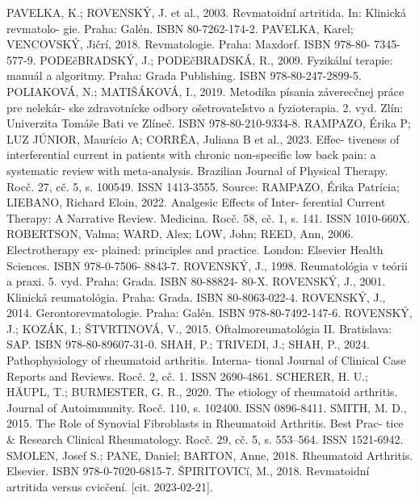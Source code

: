 PAVELKA, K.; ROVENSKÝ, J. et al., 2003. Revmatoidní artritida. In: Klinická revmatolo-
gie. Praha: Galén. ISBN 80-7262-174-2.
PAVELKA, Karel; VENCOVSKÝ, Jičrí, 2018. Revmatologie. Praha: Maxdorf. ISBN 978-80-
7345-577-9.
PODEčBRADSKÝ, J.; PODEčBRADSKÁ, R., 2009. Fyzikální terapie: manuál a algoritmy.
Praha: Grada Publishing. ISBN 978-80-247-2899-5.
POLIAKOVÁ, N.; MATIŠÁKOVÁ, I., 2019. Metodika písania záverecčnej práce pre nelekár-
ske zdravotnícke odbory ošetrovateľstvo a fyzioterapia. 2. vyd. Zlín: Univerzita Tomáše
Bati ve Zlíneč. ISBN 978-80-210-9334-8.
RAMPAZO, Érika P; LUZ JÚNIOR, Maurício A; CORRÊA, Juliana B et al., 2023. Effec-
tiveness of interferential current in patients with chronic non-specific low back pain: a
systematic review with meta-analysis. Brazilian Journal of Physical Therapy. Rocč. 27, cč.
5, s. 100549. ISSN 1413-3555. Source:
RAMPAZO, Érika Patrícia; LIEBANO, Richard Eloin, 2022. Analgesic Effects of Inter-
ferential Current Therapy: A Narrative Review. Medicina. Rocč. 58, cč. 1, s. 141. ISSN
1010-660X.
ROBERTSON, Valma; WARD, Alex; LOW, John; REED, Ann, 2006. Electrotherapy ex-
plained: principles and practice. London: Elsevier Health Sciences. ISBN 978-0-7506-
8843-7.
ROVENSKÝ, J., 1998. Reumatológia v teórii a praxi. 5. vyd. Praha: Grada. ISBN 80-88824-
80-X.
ROVENSKÝ, J., 2001. Klinická reumatológia. Praha: Grada. ISBN 80-8063-022-4.
ROVENSKÝ, J., 2014. Gerontorevmatologie. Praha: Galén. ISBN 978-80-7492-147-6.
ROVENSKÝ, J.; KOZÁK, I.; ŠTVRTINOVÁ, V., 2015. Oftalmoreumatológia II. Bratislava:
SAP. ISBN 978-80-89607-31-0.
SHAH, P.; TRIVEDI, J.; SHAH, P., 2024. Pathophysiology of rheumatoid arthritis. Interna-
tional Journal of Clinical Case Reports and Reviews. Rocč. 2, cč. 1. ISSN 2690-4861.
SCHERER, H. U.; HÄUPL, T.; BURMESTER, G. R., 2020. The etiology of rheumatoid
arthritis. Journal of Autoimmunity. Rocč. 110, s. 102400. ISSN 0896-8411.
SMITH, M. D., 2015. The Role of Synovial Fibroblasts in Rheumatoid Arthritis. Best Prac-
tice & Research Clinical Rheumatology. Rocč. 29, cč. 5, s. 553–564. ISSN 1521-6942.
SMOLEN, Josef S.; PANE, Daniel; BARTON, Anne, 2018. Rheumatoid Arthritis. Elsevier.
ISBN 978-0-7020-6815-7.
ŠPIRITOVICí, M., 2018. Revmatoidní artritida versus cvicčení. [cit. 2023-02-21].


